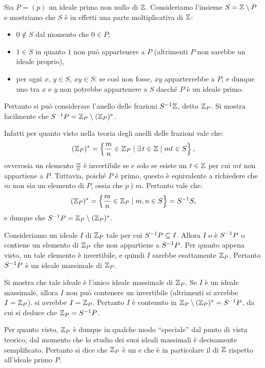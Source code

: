 \documentclass[11pt]{scrartcl}
\begin{document}
	
	Sia $P = (p)$ un ideale primo non nullo di $\mathbb Z$. Consideriamo l'insieme
	$S = \mathbb Z \setminus P$ e mostriamo che $S$ è in effetti una parte moltiplicativa
	di $\mathbb Z$:
	
	\begin{itemize}
		\item $0 \notin S$ dal momento che $0 \in P$;
		\item $1 \in S$ in quanto $1$ non può appartenere a $P$ (altrimenti $P$ non sarebbe un ideale proprio),
		\item per ogni $x$, $y \in S$, $xy \in S$: se così non fosse, $xy$ apparterrebbe
		a $P$, e dunque uno tra $x$ e $y$ non potrebbe appartenere a $S$ dacché
		$P$ è un ideale primo.
	\end{itemize}

	Pertanto si può considerare l'anello delle frazioni $S^{-1} \mathbb Z$, detto
	$\mathbb Z_P$. Si mostra facilmente che $S^{-1} P = \mathbb Z_P \setminus (\mathbb Z_P)^*$. \medskip
	
	
	Infatti per quanto visto nella teoria degli anelli delle frazioni vale che:
	\[ (\mathbb Z_P)^* = \left\{ \frac{m}{n} \in \mathbb Z_P \mid \exists \, t \in \mathbb Z \mid mt \in S \right\}, \]
	ovverosia un elemento $\frac{m}{n}$ è invertibile se e solo se esiste un $t \in \mathbb Z$
	per cui $mt$ non appartiene a $P$. Tuttavia, poiché $P$ è primo, questo è
	equivalente a richiedere che $m$ non sia un elemento di $P$, ossia che $p \nmid m$.
	Pertanto vale che:
	\[ (\mathbb Z_P)^* = \left\{ \frac{m}{n} \in \mathbb Z_P \mid m, n \in S \right\} = S^{-1} S, \]
	e dunque che $S^{-1} P = \mathbb Z_P \setminus (\mathbb Z_P)^*$.
	
	\begin{remark}
		Consideriamo un ideale $I$ di $\mathbb Z_P$ tale per cui $S^{-1} P \subseteq I$.
		Allora $I$ o è $S^{-1} P$ o contiene un elemento di $\mathbb Z_P$ che non appartiene
		a $S^{-1} P$. Per quanto appena visto, un tale elemento è invertibile, e
		quindi $I$ sarebbe esattamente $\mathbb Z_P$. Pertanto $S^{-1} P$ è un ideale
		massimale di $\mathbb Z_P$. \medskip
		
		
		Si mostra che tale ideale è l'unico ideale massimale di $\mathbb Z_P$. Se $I$
		è un ideale massimale, allora $I$ non può contenere un invertibile (altrimenti si avrebbe $I = \mathbb Z_P$).
		si avrebbe $I = \mathbb Z_P$. Pertanto $I$ è contenuto in
		$\mathbb Z_P \setminus (\mathbb Z_P)^* = S^{-1} P$, da cui si deduce che $\mathbb Z_P = S^{-1} P$.
	\end{remark}
	
	Per quanto visto, $\mathbb Z_P$ è dunque in qualche modo ``speciale'' dal punto
	di vista teorico, dal momento che lo studio dei suoi ideali massimali è
	decisamente semplificato. Pertanto si dice che $\mathbb Z_P$ è un 
	e che è in particolare il  di $\mathbb Z$ rispetto all'ideale primo
	$P$. \medskip
	
\end{document}
